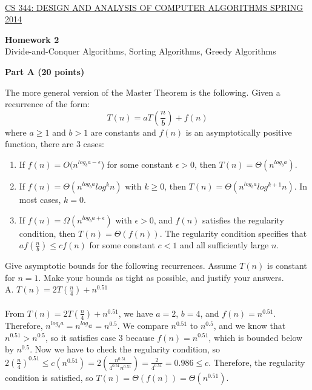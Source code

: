 \documentclass{article}
\begin{document}
\sloppy

\\


\noindent \underline{CS 344: DESIGN AND ANALYSIS OF COMPUTER
  ALGORITHMS \hspace{1.6in} SPRING 2014}

\vspace{0.1in}

\begin{center}
{\bf {\large Homework 2}}\\
Divide-and-Conquer Algorithms, Sorting Algorithms, Greedy Algorithms\\
\end{center}


\vspace{0.1in}

{\bf }

\begin{center}
{\bf Part A (20 points)}
\end{center}

 The more general version of the Master
Theorem is the following. Given a recurrence of the form: 
$$T(n) = a T(\frac{n}{b}) + f(n)$$
where $a \geq 1$ and $b > 1$ are constants and $f(n)$ is an
asymptotically positive function, there are 3 cases: 
\begin{enumerate}
\item If $f(n) = O(n^{log_ba - \epsilon}$) for some constant $\epsilon
  > 0$, then $T(n) = \Theta(n^{log_ba})$.
\item If $f(n) = \Theta(n^{log_ba} log^kn)$ with $k \geq 0$, then
  $T(n) = \Theta(n^{log_ba} log^{k+1}n)$. In most cases, $k = 0$.
\item If $f(n) = \Omega(n^{log_ba+\epsilon})$ with $\epsilon > 0$, and
  $f(n)$ satisfies the regularity condition, then $T(n) = \Theta( f(n)
  )$. The regularity condition specifies that $a f(\frac{n}{b}) \leq c
  f(n)$ for some constant $c < 1$ and all sufficiently large $n$.
\end{enumerate}

\noindent Give asymptotic bounds for the following recurrences. Assume
$T(n)$ is constant for $n = 1$. Make your bounds as tight as possible,
and justify your answers.\\

\noindent A. $T(n) = 2T(\frac{n}{4}) + n^{0.51}$\\\\
From $T(n) = 2T(\frac{n}{4}) + n^{0.51}$, we have $a=2$, $b=4$, and $f(n)=n^{0.51}$. Therefore, $n^{log_ba} = n^{log_42} = n^{0.5}$. We compare $n^{0.51}$ to $n^{0.5}$, and we know that $n^{0.51} > n^{0.5}$, so it satisfies case 3 because $f(n) = n^{0.51}$, which is bounded below by $n^{0.5}$. Now we have to check the regularity condition, so $2 (\frac{n}{4})^{0.51} \leq c (n^{0.51}) = 2 (\frac{n^{0.51}}{4^{0.51}n^{0.51}}) = \frac{2}{4^{0.51}} = 0.986 \leq c$. Therefore, the regularity condition is satisfied, so $T(n) = \Theta( f(n)) = \Theta(n^{0.51})$. \\\\
\end{document}
